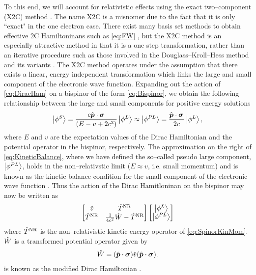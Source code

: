 To this end, we will account for relativistic effects using the exact two--component (X2C) method \cite{Peng06_044102,Li16_3711,Saue07_064102,Cheng07_104106,Reiher13_184105,Liu16_204}.
The name X2C is a misnomer due to the fact that it is only ``exact" in the one electron case. There
exist many basis set methods to obtain effective 2C Hamiltoninans such as \cref{eq:FW} \cite{Wolf15_book,Hess02_9215,Liu10_1679,Kroll74_89,Hess86_3742,Dyall97_9618,Snijders93_4597},
but the X2C method is an especially attractive method in that it is a one step transformation, rather than
an iterative procedure such as those involved in the Douglass--Kroll--Hess method and its variants \cite{Hess02_9215}.
The X2C method operates under the assumption that there exists a linear, energy independent transformation which
links the large and small component of the electronic wave function. Expanding out the action of \cref{eq:DiracHam}
on a bispinor of the form \cref{eq:Bispinor}, we obtain the following relationship between the large and small components for positive energy 
solutions
\begin{equation}
  \label{eq:KineticBalance}
  \left\vert \phi^S \right\rangle = \frac{c \hat{\boldsymbol{p}} \cdot \boldsymbol{\sigma}_{}}{(E - v + 2c^2)} \left\vert \phi^L  \right\rangle \approx 
    \left\vert \phi^{PL}  \right\rangle = \frac{\hat{\boldsymbol{p}} \cdot \boldsymbol{\sigma}_{}}{2c} \left\vert \phi^L  \right\rangle,
\end{equation}
where $E$ and $v$ are the expectation values of the Dirac Hamiltonian and the potential operator in the bispinor, respectively.
The approximation on the right of \cref{eq:KineticBalance}, where we have defined the so--called pseudo large component, $\left\vert \phi^{PL} \right\rangle$,
holds in the non--relativstic limit ($E \approx v$, i.e. small momentum)
and is known as the kinetic balance condition for the small component of the electronic wave function \cite{Wolf15_book}. 
Thus the action of the Dirac Hamitloninan on the bispinor may now be written as
\begin{equation}
\label{eq:ModDirac}
\begin{bmatrix}
\hat{v} & \hat{T}^{\mathrm{NR}} \\ \hat{T}^{\mathrm{NR}} & \frac{1}{4c^2} \hat{W} - \hat{T}^{\mathrm{NR}}
\end{bmatrix}
\begin{bmatrix}
\left\vert \phi^L \right\rangle \\ \left\vert \phi^{PL} \right\rangle
\end{bmatrix}
\end{equation}
where $\hat{T}^{\mathrm{NR}}$ is the non--relativistic kinetic energy operator of \cref{eq:SpinorKinMom}. $\hat{W}$ is a transformed
potential operator given by
\begin{equation}
\hat{W} = (\hat{\boldsymbol{p}} \cdot \boldsymbol{\sigma}_{}) \hat{v} (\hat{\boldsymbol{p}} \cdot \boldsymbol{\sigma}_{}).
\end{equation}
 is known as the modified Dirac Hamiltonian \cite{Wolf15_book}.

